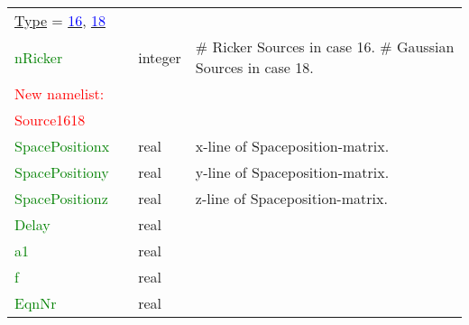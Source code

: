 \documentclass[12pt,twoside]{article}
\begin{document}
\begin{table}[H]
\begin{center}
\begin{tabular}{|p{4cm}|p{2.7cm}|p{2cm}|p{4cm}|}
\uline{Type} = \hyperlink{src16}{\textcolor{blue}{16}}, \hyperlink{src18}{\textcolor{blue}{18}} & & &\\
\textcolor{green}{nRicker} & & integer & \# Ricker Sources in case 16. \# Gaussian Sources in case 18.\\
\textcolor{red}{New namelist:} & & &\\
\textcolor{red}{Source1618} & & &\\
\textcolor{green}{SpacePositionx} &  & real & x-line of Spaceposition-matrix.  \\
\textcolor{green}{SpacePositiony} &  & real & y-line of Spaceposition-matrix. \\
\textcolor{green}{SpacePositionz} &  & real & z-line of Spaceposition-matrix. \\
\textcolor{green}{Delay} &  & real & \\
\textcolor{green}{a1} &  & real & \\
\textcolor{green}{f} &  & real & \\
\textcolor{green}{EqnNr} &  & real & \\
\hline
%

\end{tabular}
\end{center}
\end{table}
\end{document}
